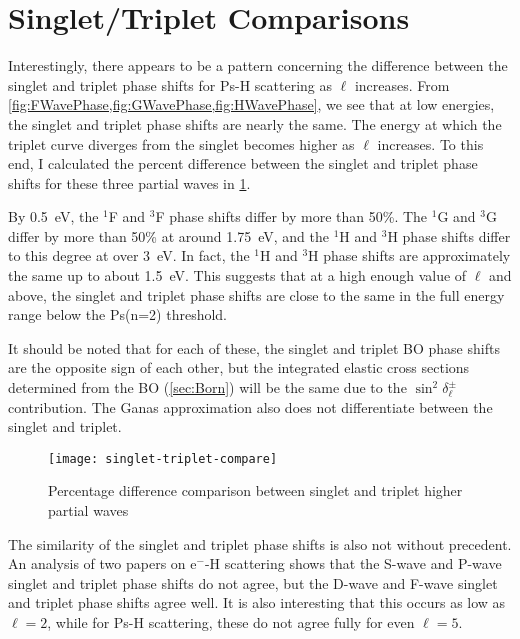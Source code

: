 \documentclass[Dissertation.tex]{subfiles}
\begin{document}
\section{Singlet/Triplet Comparisons}
\label{sec:SingTripCompare}

Interestingly, there appears to be a pattern concerning the difference between
the singlet and triplet phase shifts for Ps-H scattering as $\ell$ increases.
From \cref{fig:FWavePhase,fig:GWavePhase,fig:HWavePhase}, we see that at low
energies, the singlet and triplet phase shifts are nearly the same. The energy
at which the triplet curve diverges from the singlet becomes higher as $\ell$
increases. To this end, I calculated the percent difference between the singlet
and triplet phase shifts for these three partial waves in
\cref{fig:singlet-triplet-compare}.

By \SI{0.5}{eV}, the $^1$F and $^3$F phase shifts differ by more than 50\%. The
$^1$G and $^3$G differ by more than 50\% at around \SI{1.75}{eV}, and the $^1$H
and $^3$H phase shifts differ to this degree at over \SI{3}{eV}. In fact, the
$^1$H and $^3$H phase shifts are approximately the same up to about \SI{1.5}{eV}.
This suggests that at a high enough value of $\ell$ and above, the singlet and
triplet phase shifts are close to the same in the full energy range below the
Ps(n=2) threshold.

It should be noted that for each of these, the singlet and triplet
BO phase shifts are the opposite sign of each other, but the
integrated elastic cross sections
determined from the BO (\cref{sec:Born}) will be the same due to the
$\sin^2 \! \delta_\ell^\pm$ contribution. The Ganas approximation also does
not differentiate between the singlet and triplet.

\begin{figure}
	\centering
	\texttt{[image: singlet-triplet-compare]}
	\caption[Singlet and triplet higher partial wave comparisons]{Percentage difference comparison between singlet and triplet higher partial waves}
	\label{fig:singlet-triplet-compare}
\end{figure}

The similarity of the singlet and triplet phase shifts is also
not without precedent. An analysis of two papers on
e$^-$-H scattering \cite{Shertzer1994,Chen1997} shows that the S-wave and
P-wave singlet and triplet phase shifts do not agree, but the D-wave and
F-wave singlet and triplet phase shifts agree well. It is also interesting
that this occurs as low as $\ell = 2$, while for Ps-H scattering, these do
not agree fully for even $\ell = 5$.
\end{document}
